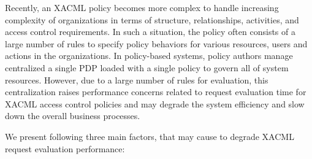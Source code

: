  
 



Recently, an XACML policy becomes more complex to handle increasing complexity of organizations in terms of structure, relationships, activities, and access control requirements. In such a situation, the policy often consists of a large number of rules to specify policy behaviors for various resources, users and actions in the organizations.
In policy-based systems, policy authors manage centralized a single PDP loaded with a single policy to govern all of system resources. 
However, due to a large number of rules for evaluation, this centralization raises performance concerns related to request evaluation time for XACML access control policies and may 
degrade the system efficiency and slow down the overall business processes. 

We present following three main factors, that may cause to degrade XACML request evaluation performance: 

